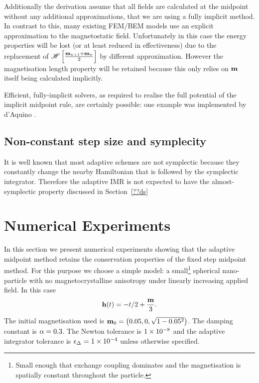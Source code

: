 Additionally the derivation assume that all fields are calculated at the midpoint without any additional approximations, \ie that we are using a fully implicit method.
In contrast to this, many existing FEM/BEM models use an explicit approximation to the magnetostatic field.
Unfortunately in this case the energy properties will be lost (or at least reduced in effectiveness) due to the replacement of $\mathscr{H} \left[ \frac{\mathbf{m}_{n+1} + \mathbf{m}_n}{2} \right]$ by different approximation.
However the magnetisation length property will be retained because this only relies on $\mathbf{m}$ itself being calculated implicitly.

Efficient, fully-implicit solvers, as required to realise the full potential of the implicit midpoint rule, are certainly possible: one example was implemented by d'Aquino \etal.\cite{DAquino2005}

\subsection{Non-constant step size and symplecity}
\label{sec:non-constant-step}

It is well known that most adaptive schemes are not symplectic\cite[pg. 91]{Iserles2009} because they constantly change the nearby Hamiltonian that is followed by the symplectic integrator.
Therefore the adaptive IMR is not expected to have the almost-symplectic property discussed in Section~\ref{??ds}



\section{Numerical Experiments}

In this section we present numerical experiments showing that the adaptive midpoint method retains the conservation properties of the fixed step midpoint method.
For this purpose we choose a simple model: a small\footnote{Small enough that exchange coupling dominates and the magnetisation is spatially constant throughout the particle.} spherical nano-particle with no magnetocrystalline anisotropy under linearly increasing applied field.
In this case
\begin{equation}
  \mathbf{h}(t) = - t/2 +  \frac{\mathbf{m}}{3}.
\end{equation}
The initial magnetisation used is $\mathbf{m}_0 = \left( 0.05, 0, \sqrt{1 - 0.05^2} \right)$.
The damping constant is $\alpha = 0.3$.
The Newton tolerance is $1\times 10^{-8}$ and the adaptive integrator tolerance is $\epsilon_{\Delta_{}} = 1\times 10^{-4}$ unless otherwise specified.

